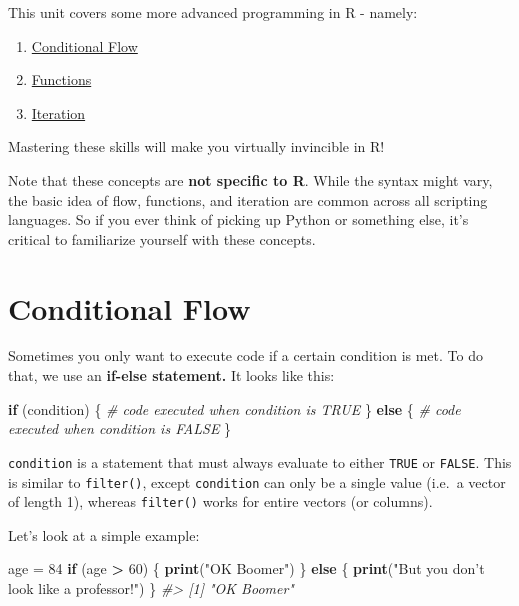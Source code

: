 \documentclass[]{book}
\newenvironment{Shaded}{\begin{snugshade}}{\end{snugshade}}
\newcommand{\CommentTok}[1]{\textcolor[rgb]{0.56,0.35,0.01}{\textit{#1}}}
\newcommand{\ControlFlowTok}[1]{\textcolor[rgb]{0.13,0.29,0.53}{\textbf{#1}}}
\newcommand{\DecValTok}[1]{\textcolor[rgb]{0.00,0.00,0.81}{#1}}
\newcommand{\KeywordTok}[1]{\textcolor[rgb]{0.13,0.29,0.53}{\textbf{#1}}}
\newcommand{\NormalTok}[1]{#1}
\newcommand{\OperatorTok}[1]{\textcolor[rgb]{0.81,0.36,0.00}{\textbf{#1}}}
\newcommand{\StringTok}[1]{\textcolor[rgb]{0.31,0.60,0.02}{#1}}
\providecommand{\tightlist}{%
  \setlength{\itemsep}{0pt}\setlength{\parskip}{0pt}}
\begin{document}
This unit covers some more advanced programming in R - namely:

\begin{enumerate}
\def\labelenumi{\arabic{enumi}.}
\tightlist
\item
  \protect\hyperlink{conditional-flow}{Conditional Flow}
\item
  \protect\hyperlink{functions-1}{Functions}
\item
  \protect\hyperlink{iteration}{Iteration}
\end{enumerate}

Mastering these skills will make you virtually invincible in R!

Note that these concepts are \textbf{not specific to R}. While the syntax might vary, the basic idea of flow, functions, and iteration are common across all scripting languages. So if you ever think of picking up Python or something else, it's critical to familiarize yourself with these concepts.

\hypertarget{conditional-flow}{%
\section{Conditional Flow}\label{conditional-flow}}

Sometimes you only want to execute code if a certain condition is met. To do that, we use an \textbf{if-else statement.} It looks like this:

\begin{Shaded}
\begin{Highlighting}[]
\ControlFlowTok{if}\NormalTok{ (condition) \{}
  \CommentTok{# code executed when condition is TRUE}
\NormalTok{\} }\ControlFlowTok{else}\NormalTok{ \{}
  \CommentTok{# code executed when condition is FALSE}
\NormalTok{\}}
\end{Highlighting}
\end{Shaded}

\texttt{condition} is a statement that must always evaluate to either \texttt{TRUE} or \texttt{FALSE}. This is similar to \texttt{filter()}, except \texttt{condition} can only be a single value (i.e.~a vector of length 1), whereas \texttt{filter()} works for entire vectors (or columns).

Let's look at a simple example:

\begin{Shaded}
\begin{Highlighting}[]
\NormalTok{age =}\StringTok{ }\DecValTok{84}
\ControlFlowTok{if}\NormalTok{ (age }\OperatorTok{>}\StringTok{ }\DecValTok{60}\NormalTok{) \{}
    \KeywordTok{print}\NormalTok{(}\StringTok{"OK Boomer"}\NormalTok{)}
\NormalTok{\} }\ControlFlowTok{else}\NormalTok{ \{}
    \KeywordTok{print}\NormalTok{(}\StringTok{"But you don't look like a professor!"}\NormalTok{)}
\NormalTok{\}}
\CommentTok{#> [1] "OK Boomer"}
\end{Highlighting}
\end{Shaded}
\end{document}
